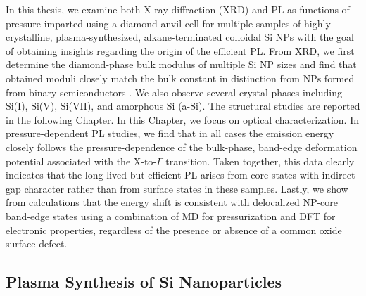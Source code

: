 In this thesis, we examine both X-ray diffraction (XRD) and PL as functions of pressure imparted using a diamond anvil cell for multiple samples of highly crystalline, plasma-synthesized, alkane-terminated colloidal Si NPs with the goal of obtaining insights regarding the origin of the efficient PL. From XRD, we first determine the diamond-phase bulk modulus of multiple Si NP sizes and find that obtained moduli closely match the bulk constant in distinction from NPs formed from binary semiconductors \cite{jiang2004phase}. We also observe several crystal phases including Si(I), Si(V), Si(VII), and amorphous Si (a-Si). The structural studies are reported in the following Chapter. In this Chapter, we focus on optical characterization. In pressure-dependent PL studies, we find that in all cases the emission energy closely follows the pressure-dependence of the bulk-phase, band-edge deformation potential associated with the X-to-$\Gamma$ transition. Taken together, this data clearly indicates that the long-lived but efficient PL arises from core-states with indirect-gap character rather than from surface states in these samples. Lastly, we show from calculations that the energy shift is consistent with delocalized NP-core band-edge states using a combination of MD for pressurization and DFT for electronic properties, regardless of the presence or absence of a common oxide surface defect.  

\subsection{Plasma Synthesis of Si Nanoparticles}

